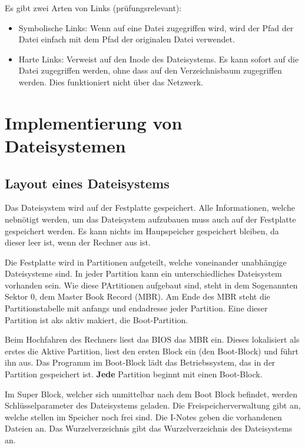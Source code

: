Es gibt zwei Arten von Links (prüfungsrelevant):

\begin{itemize}
    \item Symbolische Links: Wenn auf eine Datei zugegriffen wird, wird der Pfad der
          Datei einfach mit dem Pfad der originalen Datei verwendet.
    \item Harte Links: Verweist auf den Inode des Dateisystems. Es kann sofort auf die
          Datei zugegriffen werden, ohne dass auf den Verzeichnisbaum zugegriffen werden.
          Dies funktioniert nicht über das Netzwerk.
\end{itemize}

\section{Implementierung von Dateisystemen}

\subsection{Layout eines Dateisystems}

Das Dateisystem wird auf der Festplatte gespeichert. Alle Informationen, welche
nebnötigt werden, um das Dateisystem aufzubauen muss auch auf der Festplatte
gespeichert werden. Es kann nichts im Haupspeicher gespeichert bleiben, da
dieser leer ist, wenn der Rechner aus ist.

Die Festplatte wird in Partitionen aufgeteilt, welche voneinander unabhängige
Dateisysteme sind. In jeder Partition kann ein unterschiedliches Dateisystem
vorhanden sein. Wie diese PArtitionen aufgebaut sind, steht in dem Sogenannten
Sektor 0, dem Master Book Record (MBR). Am Ende des MBR steht die
Partitionstabelle mit anfangs und endadresse jeder Partition. Eine dieser
Partition ist aks aktiv makiert, die Boot-Partition.

Beim Hochfahren des Rechners liest das BIOS das MBR ein. Dieses lokalisiert als
erstes die Aktive Partition, liest den ersten Block ein (den Boot-Block) und
führt ihn aus. Das Programm im Boot-Block lädt das Betriebssystem, das in der
Partition gespeichert ist. \textbf{Jede} Partition beginnt mit einen
Boot-Block.

Im Super Block, welcher sich unmittelbar nach dem Boot Block befindet, werden
Schlüsselparameter des Dateisystems geladen. Die Freispeicherverwaltung gibt
an, welche stellen im Speicher noch frei sind. Die I-Notes geben die
vorhandenen Dateien an. Das Wurzelverzeichnis gibt das Wurzelverzeichnis des
Dateisystems an.

